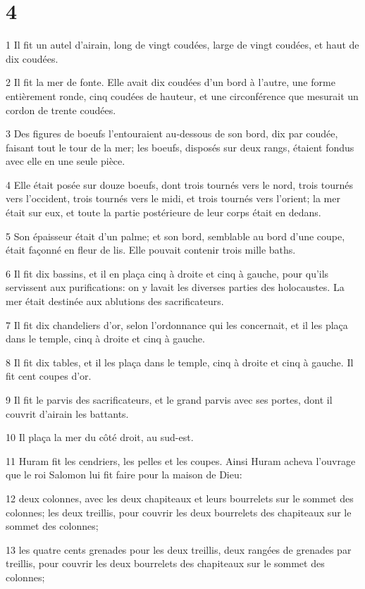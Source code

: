 \chapter{4}

\par 1 Il fit un autel d'airain, long de vingt coudées, large de vingt coudées, et haut de dix coudées.
\par 2 Il fit la mer de fonte. Elle avait dix coudées d'un bord à l'autre, une forme entièrement ronde, cinq coudées de hauteur, et une circonférence que mesurait un cordon de trente coudées.
\par 3 Des figures de boeufs l'entouraient au-dessous de son bord, dix par coudée, faisant tout le tour de la mer; les boeufs, disposés sur deux rangs, étaient fondus avec elle en une seule pièce.
\par 4 Elle était posée sur douze boeufs, dont trois tournés vers le nord, trois tournés vers l'occident, trois tournés vers le midi, et trois tournés vers l'orient; la mer était sur eux, et toute la partie postérieure de leur corps était en dedans.
\par 5 Son épaisseur était d'un palme; et son bord, semblable au bord d'une coupe, était façonné en fleur de lis. Elle pouvait contenir trois mille baths.
\par 6 Il fit dix bassins, et il en plaça cinq à droite et cinq à gauche, pour qu'ils servissent aux purifications: on y lavait les diverses parties des holocaustes. La mer était destinée aux ablutions des sacrificateurs.
\par 7 Il fit dix chandeliers d'or, selon l'ordonnance qui les concernait, et il les plaça dans le temple, cinq à droite et cinq à gauche.
\par 8 Il fit dix tables, et il les plaça dans le temple, cinq à droite et cinq à gauche. Il fit cent coupes d'or.
\par 9 Il fit le parvis des sacrificateurs, et le grand parvis avec ses portes, dont il couvrit d'airain les battants.
\par 10 Il plaça la mer du côté droit, au sud-est.
\par 11 Huram fit les cendriers, les pelles et les coupes. Ainsi Huram acheva l'ouvrage que le roi Salomon lui fit faire pour la maison de Dieu:
\par 12 deux colonnes, avec les deux chapiteaux et leurs bourrelets sur le sommet des colonnes; les deux treillis, pour couvrir les deux bourrelets des chapiteaux sur le sommet des colonnes;
\par 13 les quatre cents grenades pour les deux treillis, deux rangées de grenades par treillis, pour couvrir les deux bourrelets des chapiteaux sur le sommet des colonnes;
